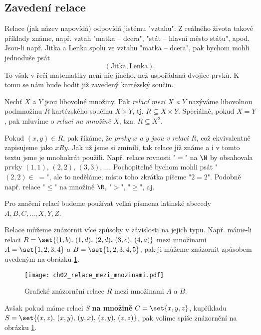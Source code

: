 \subsection{Zavedení relace}
Relace (jak název napovídá) odpovídá jistému "vztahu". Z reálného života takové příklady známe, např. vztah "matka -- dcera", "stát -- hlavní město státu", apod. Jsou-li např. Jitka a Lenka spolu ve vztahu "matka -- dcera", pak bychom mohli jednoduše psát
\begin{equation*}
    (\text{Jitka}, \text{Lenka}).
\end{equation*}
To však v řeči matematiky není nic jiného, než uspořádaná dvojice prvků. K tomu se nám bude hodit již zavedený kartézský součin.
\begin{definition}[Relace]\label{def:relace}
    Nechť $X$ a $Y$ jsou libovolné množiny. Pak \emph{relací mezi $X$ a $Y$} nazýváme libovolnou podmnožinu $R$ kartézského součinu $X\times Y$, tj. \linebreak $R\subseteq X \times Y$. Speciálně, pokud $X=Y$, pak mluvíme o \emph{relaci na množině $X$}, tzn. $R\subseteq X^2$.
\end{definition}
Pokud $(x,y)\in R$, pak říkáme, že \emph{prvky $x$ a $y$ jsou v relaci $R$}, což ekvivalentně zapisujeme jako $xRy$. Jak už jsme si zmínili, tak relace již známe a i v tomto textu jsme je mnohokrát použili. Např. relace rovnosti "$=$" na $\N$ by obsahovala prvky $(1,1),\,(2,2),\,(3,3),\dots$. Pochopitelně bychom mohli psát "$(2,2)\in\;=$", ale to neděláme; místo toho zkrátka píšeme "$2=2$". Podobně např. relace "$\leq$" na množině $\R$, "$>$", "$\geq$", aj.
\begin{convention}
    Pro značení relací budeme používat velká písmena latinské abecedy $A,B,C,\dots,X,Y,Z$.
\end{convention}
Relace můžeme znázornit více způsoby v závislosti na jejich typu. Např. máme-li relaci $R=\set{(1,b),\,(1,d),\,(2,d),\,(3,c),\,(4,a)}$ mezi množinami $A=\set{1,2,3,4}$ a $B=\set{1,2,3,4,5}$, pak ji můžeme znázornit způsobem uvedeným na obrázku \ref{fig:relace_mezi_mnozinami}.
\begin{figure}[h]
    \centering
    \texttt{[image: ch02\_relace\_mezi\_mnozinami.pdf]}
    \caption{Grafické znázornění relace $R$ mezi množinami $A$ a $B$.}
    \label{fig:relace_mezi_mnozinami}
\end{figure}
Avšak pokud máme relaci $S$ \textbf{na množině} $C=\set{x,y,z}$, kupříkladu $S=\set{(x,z),\,(x,y),\,(y,x),\,(z,y),\,(z,z)}$, pak volíme spíše znázornění na obrázku \ref{fig:relace_mezi_mnozinami}.

